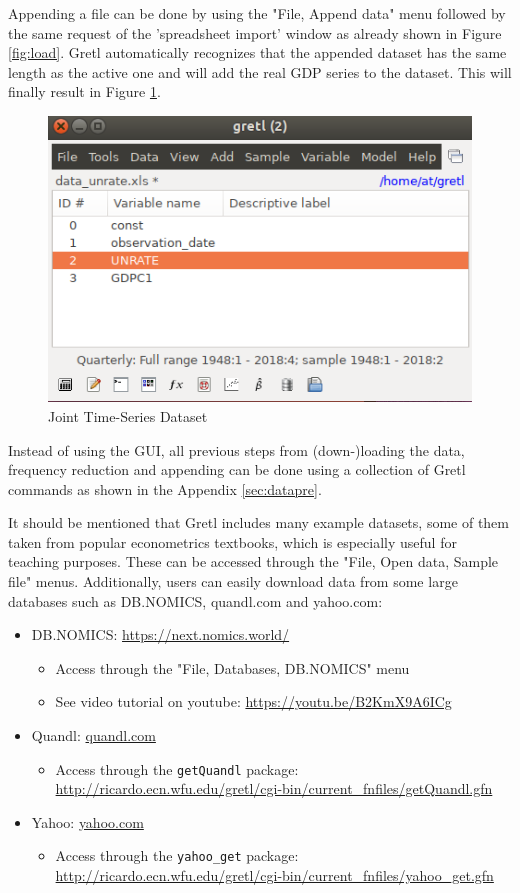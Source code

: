 \documentclass[11pt]{article}
\begin{document}
Appending a file can be done by using the "File, Append data" menu followed by the same request of the 'spreadsheet import' window as already shown in Figure \ref{fig:load}. Gretl automatically recognizes that the appended dataset has the same length as the active one and will add the real GDP series to the dataset. This will finally result in Figure \ref{fig:append}.

\begin{figure}[!h]
	\centering
	\includegraphics[width=.42\textwidth]{../figures/gretl_after_appending}
	\caption{Joint Time-Series Dataset}
	\label{fig:append}
\end{figure}

Instead of using the GUI, all previous steps from (down-)loading the data, frequency reduction and appending can be done using a collection of Gretl commands as shown in the Appendix \ref{sec:datapre}.

It should be mentioned that Gretl includes many example datasets, some of them taken from popular econometrics textbooks, which is especially useful for teaching purposes. These can be accessed through the "File, Open data, Sample file" menus. Additionally, users can easily download data from some large databases such as DB.NOMICS, quandl.com and yahoo.com:
\begin{itemize}
	\item DB.NOMICS: \url{https://next.nomics.world/}
	\begin{itemize}
		\item Access through the "File, Databases, DB.NOMICS" menu
		\item See video tutorial on youtube: \url{https://youtu.be/B2KmX9A6ICg}
	\end{itemize}
	\item Quandl: \url{quandl.com}
	\begin{itemize}
		\item Access through the \texttt{getQuandl} package: \url{http://ricardo.ecn.wfu.edu/gretl/cgi-bin/current_fnfiles/getQuandl.gfn}		
	\end{itemize}
	\item Yahoo: \url{yahoo.com}
	\begin{itemize}
		\item Access through the \texttt{yahoo\_get} package: \url{http://ricardo.ecn.wfu.edu/gretl/cgi-bin/current_fnfiles/yahoo_get.gfn}
	\end{itemize}
\end{itemize}
\end{document}
